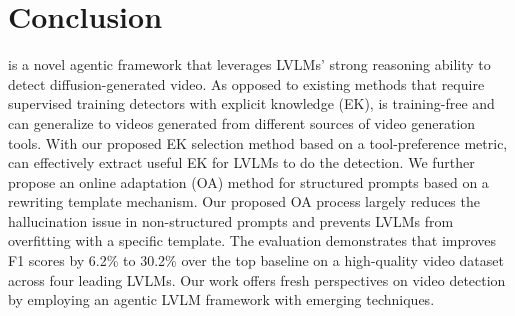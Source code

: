 \section{Conclusion}
\label{sec:conclusion}

\lavid is a novel agentic framework that leverages LVLMs' strong reasoning ability to detect diffusion-generated video. 
As opposed to existing methods that require supervised training detectors with explicit knowledge (EK), \lavid is training-free and can generalize to videos generated from different sources of video generation tools.
With our proposed EK selection method based on a tool-preference metric, \lavid can effectively extract useful EK for LVLMs to do the detection. We further propose an online adaptation (OA) method for structured prompts based on a rewriting template mechanism. Our proposed OA process largely reduces the hallucination issue in non-structured prompts and prevents LVLMs from overfitting with a specific template. The evaluation demonstrates that \lavid improves F1 scores by 6.2\% to 30.2\% over the top baseline on a high-quality video dataset across four leading LVLMs. Our work offers fresh perspectives on video detection by employing an agentic LVLM framework with emerging techniques.


